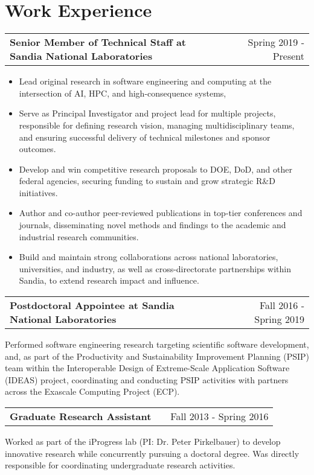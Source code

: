 \documentclass[a4paper,12pt]{article}
\makeatletter
\newenvironment{jobshort}[2]
    {
    \begin{tabularx}{\linewidth}{@{}l X r@{}}
    \textbf{#1} & \hfill &  #2 \\[3.75pt]
    \end{tabularx}
    }
    {
    }
\newenvironment{joblong}[2]
    {
    \begin{tabularx}{\linewidth}{@{}l X r@{}}
    \textbf{#1} & \hfill &  #2 \\[3.75pt]
    \end{tabularx}
    \begin{minipage}[t]{\linewidth}
    \begin{itemize}[nosep,after=\strut, leftmargin=1em, itemsep=3pt,label=--]
    }
    {
    \end{itemize}
    \end{minipage}    
    }
\makeatother
\begin{document}
\section{Work Experience}

\begin{joblong}{Senior Member of Technical Staff at Sandia National Laboratories}{Spring 2019 - Present}
\item Lead original research in software engineering and computing at the intersection of AI, HPC, and high-consequence systems,
\item Serve as Principal Investigator and project lead for multiple projects, responsible for defining research vision, managing multidisciplinary teams, and ensuring successful delivery of technical milestones and sponsor outcomes.
\item Develop and win competitive research proposals to DOE, DoD, and other federal agencies, securing funding to sustain and grow strategic R\&D initiatives.
\item Author and co-author peer-reviewed publications in top-tier conferences and journals, disseminating novel methods and findings to the academic and industrial research communities.
\item Build and maintain strong collaborations across national laboratories, universities, and industry, as well as cross-directorate partnerships within Sandia, to extend research impact and influence.
\end{joblong}

\begin{jobshort}{Postdoctoral Appointee at Sandia National Laboratories}{Fall 2016 - Spring 2019}
Performed software engineering research targeting scientific software development, and, as part of the Productivity and Sustainability Improvement Planning (PSIP) team within the Interoperable Design of Extreme-Scale Application Software (IDEAS) project, coordinating and conducting PSIP activities with partners across the Exascale Computing Project (ECP).
\end{jobshort}

\begin{jobshort}{Graduate Research Assistant}{Fall 2013 - Spring 2016}
Worked as part of the iProgress lab (PI: Dr. Peter Pirkelbauer) to develop innovative research while concurrently pursuing a doctoral degree. Was directly responsible for coordinating undergraduate research activities.
\end{jobshort}
\end{document}
